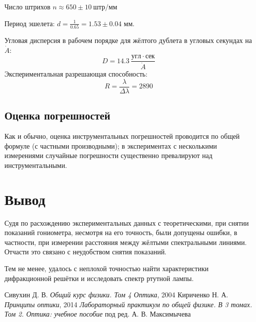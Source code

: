 \documentclass[a4paper]{article}
\begin{document}
Число штрихов $n \approx 650 \pm 10\ штр/мм$

Период эшелета: $d = \frac{1}{0.65} = 1.53 \pm 0.04$ мм.

Угловая дисперсия в рабочем порядке для жёлтого дублета в угловых секундах на $\dot A$:
\[
D = 14.3\ \frac{угл \cdot сек}{\dot A}
\]
Экспериментальная разрешающая способность:
\[
R = \frac{\lambda}{\Delta \lambda} = 2890
\]

\subsection{Оценка погрешностей}

Как и обычно, оценка инструментальных погрешностей проводится по общей формуле (с частными производными); в экспериментах с несколькими измерениями случайные погрешности существенно превалируют над инструментальными.

\section{Вывод}

Судя по расхождению экспериментальных данных с теоретическими, при снятии показаний гониометра, несмотря на его точность, были допущены ошибки, в частности, при измерении расстояния между жёлтыми спектральными линиями. Отчасти это связано с неудобством снятия показаний.

Тем не менее, удалось с неплохой точностью найти характеристики дифракционной решётки и исследовать спектр ртутной лампы.

\newpage
\begin{thebibliography}{9}
	 Сивухин Д. В. \emph{Общий курс физики. Том 4 Оптика}, 2004
	 Кириченко Н. А. \emph{Принципы оптики}, 2014
	 \emph{Лабораторный практикум по общей физике. В 3 томах. Том 2. Оптика: учебное пособие} под ред. А. В. Максимычева
\end{thebibliography}
\end{document}
